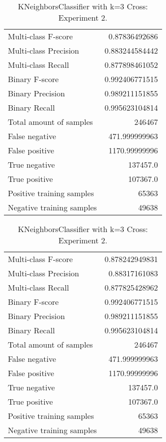 \begin{table}[H]
\begin{minipage}{0.5\textwidth}
\caption{KNeighborsClassifier with k=3 Cross: Experiment 1.}
\centering
\begin{tabular}{l r}
\toprule
Multi-class F-score & 0.87836492686 \\
Multi-class Precision & 0.883244584442 \\
Multi-class Recall & 0.877898461052 \\
\midrule
Binary F-score & 0.992406771515 \\
Binary Precision & 0.989211151855 \\
Binary Recall & 0.995623104814 \\
\midrule
Total amount of samples & 246467 \\
False negative & 471.999999963 \\
False positive & 1170.99999996 \\
True negative & 137457.0 \\
True positive & 107367.0 \\
\midrule
Positive training samples & 65363 \\
Negative training samples & 49638 \\
\bottomrule
\end{tabular}
\end{minipage}
\hfillx
\begin{minipage}{0.5\textwidth}
\caption{KNeighborsClassifier with k=3 Cross: Experiment 2.}
\centering
\begin{tabular}{l r}
\toprule
Multi-class F-score & 0.878242949831 \\
Multi-class Precision & 0.88317161083 \\
Multi-class Recall & 0.877825428962 \\
\midrule
Binary F-score & 0.992406771515 \\
Binary Precision & 0.989211151855 \\
Binary Recall & 0.995623104814 \\
\midrule
Total amount of samples & 246467 \\
False negative & 471.999999963 \\
False positive & 1170.99999996 \\
True negative & 137457.0 \\
True positive & 107367.0 \\
\midrule
Positive training samples & 65363 \\
Negative training samples & 49638 \\
\bottomrule
\end{tabular}
\end{minipage}
\end{table}
